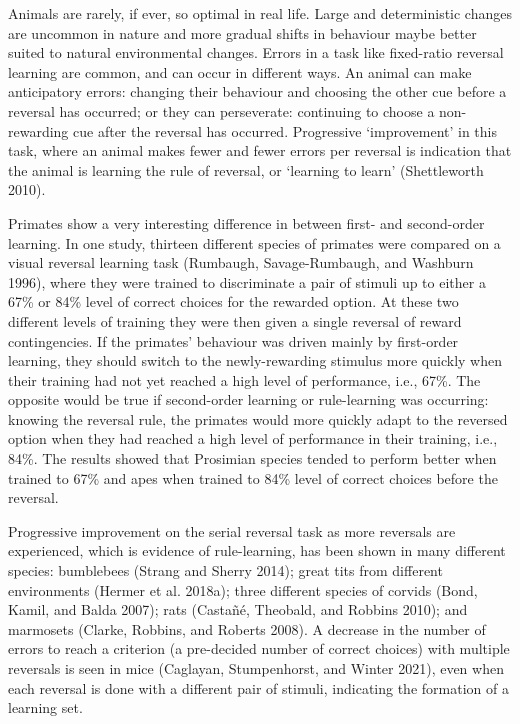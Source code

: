 \documentclass[
]{article}
\begin{document}
Animals are rarely, if ever, so optimal in real life. Large and deterministic changes are uncommon in nature and more gradual shifts in behaviour maybe better suited to natural environmental changes. Errors in a task like fixed-ratio reversal learning are common, and can occur in different ways. An animal can make anticipatory errors: changing their behaviour and choosing the other cue before a reversal has occurred; or they can perseverate: continuing to choose a non-rewarding cue after the reversal has occurred. Progressive `improvement' in this task, where an animal makes fewer and fewer errors per reversal is indication that the animal is learning the rule of reversal, or `learning to learn' (Shettleworth 2010).

Primates show a very interesting difference in between first- and second-order learning. In one study, thirteen different species of primates were compared on a visual reversal learning task (Rumbaugh, Savage-Rumbaugh, and Washburn 1996), where they were trained to discriminate a pair of stimuli up to either a 67\% or 84\% level of correct choices for the rewarded option. At these two different levels of training they were then given a single reversal of reward contingencies. If the primates' behaviour was driven mainly by first-order learning, they should switch to the newly-rewarding stimulus more quickly when their training had not yet reached a high level of performance, i.e., 67\%. The opposite would be true if second-order learning or rule-learning was occurring: knowing the reversal rule, the primates would more quickly adapt to the reversed option when they had reached a high level of performance in their training, i.e., 84\%. The results showed that Prosimian species tended to perform better when trained to 67\% and apes when trained to 84\% level of correct choices before the reversal.

Progressive improvement on the serial reversal task as more reversals are experienced, which is evidence of rule-learning, has been shown in many different species: bumblebees (Strang and Sherry 2014); great tits from different environments (Hermer et al. 2018a); three different species of corvids (Bond, Kamil, and Balda 2007); rats (Castañé, Theobald, and Robbins 2010); and marmosets (Clarke, Robbins, and Roberts 2008). A decrease in the number of errors to reach a criterion (a pre-decided number of correct choices) with multiple reversals is seen in mice (Caglayan, Stumpenhorst, and Winter 2021), even when each reversal is done with a different pair of stimuli, indicating the formation of a learning set.
\end{document}
